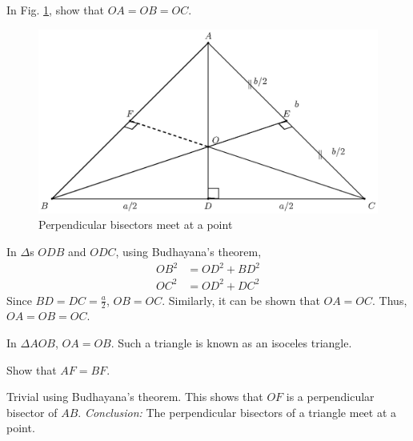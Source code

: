 \begin{problem}
	In Fig. \ref{ch3_perp_bisector}, show that $OA=OB=OC$.
\end{problem}
\begin{figure}[!ht]
	\begin{center}
		
		\includegraphics[width=\columnwidth]{./figs/fig_3.8.eps}
	\end{center}
	\caption{Perpendicular bisectors meet at a point}
	\label{ch3_perp_bisector}	
\end{figure}
%
\proof In $\Delta$s $ODB$ and $ODC$, using Budhayana's theorem,
%
\begin{equation}
\begin{split}
OB^2 &= OD^2 + BD^2 \\
OC^2 &= OD^2 + DC^2 
\end{split}
\end{equation}
%
Since $BD = DC = \frac{a}{2}$, $OB = OC$.  Similarly, it can be shown that $OA = OC$.  Thus, $OA=OB=OC$.
%
\begin{definition}
	In $\Delta AOB$, $OA = OB$.  Such a triangle is known as an isoceles triangle.
\end{definition}
%
\begin{problem}
	Show that $AF = BF$.
\end{problem}
\proof Trivial using Budhayana's theorem.  This shows that $OF$ is a perpendicular bisector of $AB$. 
{\em Conclusion:}  The perpendicular bisectors of a triangle meet at a point.
%
